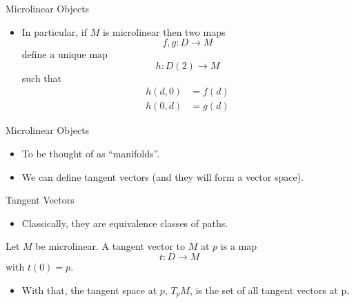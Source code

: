 \documentclass{beamer}
\begin{document}
\begin{frame}{Microlinear Objects}

\begin{itemize}
  \item In particular, if \( M \) is microlinear then two maps
    \begin{equation*}
      f,g:D\to M
    \end{equation*}
    define a unique map
    \begin{equation*}
      h:D(2)\to M
    \end{equation*}
    such that 
    \begin{align*}
      h(d,0) &= f(d)\\
      h(0,d) &= g(d)
    \end{align*}
\end{itemize}

\end{frame}

\begin{frame}{Microlinear Objects}

\begin{itemize}
  \item To be thought of as ``manifolds''.
  \item We can define tangent vectors (and they will form a vector space).
\end{itemize}

\end{frame}

\begin{frame}{Tangent Vectors}

  \begin{itemize}
    \item Classically, they are equivalence classes of paths.
  \end{itemize}
  \pause
  \begin{defn}
    Let \( M \) be microlinear. A \alert{tangent vector} to \( M \) at \( p \) is a map
    \begin{equation*}
      t:D\to M
    \end{equation*}
    with \( t(0)=p \).
  \end{defn}
  \pause
  \begin{itemize}
    \item With that, the \alert{tangent space} at \( p \), \( T_pM \), is the set of all
      tangent vectors at p.
  \end{itemize}

\end{frame}
\end{document}
